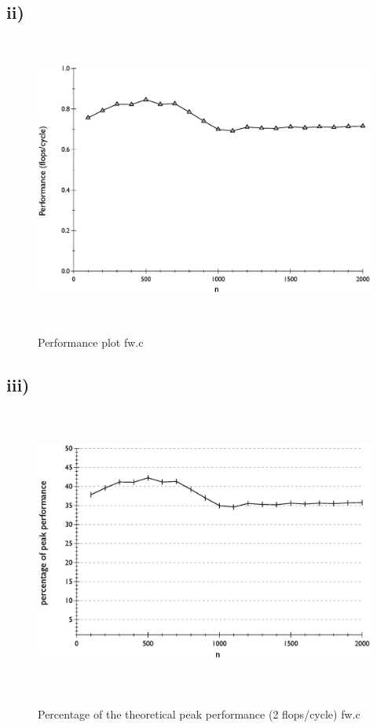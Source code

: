 \documentclass[10pt,a4paper,oneside,notitlepage]{report}
\begin{document}
\subsection*{ii)}
\begin{figure}[H]
\caption{Performance plot fw.c}
\includegraphics[height=9.5cm]{fw_performance}
\label{fw_performance}
\end{figure}
\subsection*{iii)}
\begin{figure}[H]
\caption{Percentage of the theoretical peak performance (2 flops/cycle) fw.c}
\includegraphics[height=9.5cm]{fw_percentage_of_peak}
\label{fw_percentage}
\end{figure}
\end{document}

